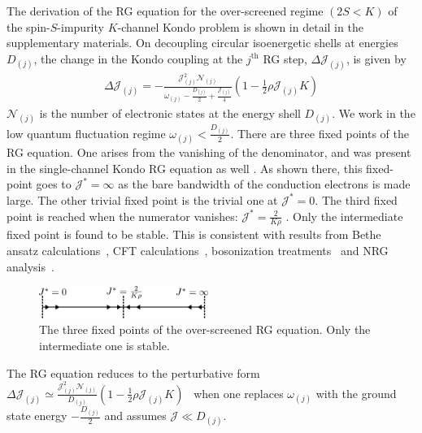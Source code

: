 \documentclass[reprint,prb,superscriptaddress]{revtex4-2}
\begin{document}
The derivation of the RG equation for the over-screened regime \((2S < K)\) of the spin-\(S\)-impurity \(K\)-channel Kondo problem is shown in detail in the supplementary materials.
On decoupling circular isoenergetic shells at energies \(D_{(j)}\), the change in the Kondo coupling at the \(j^\text{th}\) RG step, \(\Delta {\mathcal{J}}_{(j)}\), is given by
\begin{equation}\begin{aligned}
	\Delta {\mathcal{J}}_{(j)} = -\frac{{\mathcal{J}}_{(j)}^2 \mathcal{N}_{(j)}}{\omega_{(j)} - \frac{D_{(j)}}{2} + \frac{{\mathcal{J}}_{(j)}}{4}}\left( 1 - \frac{1}{2}\rho {\mathcal{J}}_{(j)} K \right) 
\end{aligned}\end{equation}
\(\mathcal{N}_{(j)}\) is the number of electronic states at the energy shell \(D_{(j)}\). We work in the low quantum fluctuation regime \(\omega_{(j)} < \frac{D_{(j)}}{2}\). There are three fixed points of the RG equation. One arises from the vanishing of the denominator, and was present in the single-channel Kondo RG equation as well \cite{kondo_urg}. As shown there, this fixed-point goes to \({\mathcal{J}}^* = \infty\) as the bare bandwidth of the conduction electrons is made large. The other trivial fixed point is the trivial one at \({\mathcal{J}}^* = 0\). The third fixed point is reached when the numerator vanishes: \({\mathcal{J}}^* = \frac{2}{K \rho}\) \cite{Gan_mchannel_1994,Kogan_2018,Kuramoto1998,Noz_blandin_1980}. Only the intermediate fixed point is found to be stable. This is consistent with results from Bethe ansatz calculations~\cite{Tsvelick_Weigmann_mchannel_1984,andrei_destri_1984,zarand_costi_2002,andrei_jerez_1995,Tsvelick_1985,Tsvelick1984}, CFT calculations~\cite{affleck_1991_overscreen,affleck1993exact,affleck_ludwig_1991}, bosonization treatments~\cite{emery_kivelson,vondelft_prl_1998} and NRG analysis~\cite{pang_cox_1991,mitchell_bulla_2014}.
\begin{figure}[htpb]
	\centering
	\includegraphics[width=0.49\textwidth]{plt/rg_flow.pdf}
	\caption{The three fixed points of the over-screened RG equation. Only the intermediate one is stable.}
	\label{rg_flow}
\end{figure}

The RG equation reduces to the perturbative form \(\Delta {\mathcal{J}}_{(j)} \simeq \frac{{\mathcal{J}}_{(j)}^2 \mathcal{N}_{(j)}}{D_{(j)}}\left( 1 - \frac{1}{2}\rho {\mathcal{J}}_{(j)} K \right)\)~\cite{Kogan_2018,Kuramoto1998,Noz_blandin_1980,tripathi2018landau} when one replaces \(\omega_{(j)}\) with the ground state energy \(-\frac{D_{(j)}}{2}\) and assumes \({\mathcal{J}} \ll D_{(j)}\).
\end{document}

